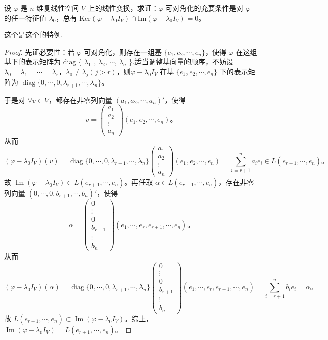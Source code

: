 \documentclass[../../main.tex]{subfiles}
\begin{document}
\begin{proposition}\label{proposition:线性变换可对角化的几何充要条件1}
设 $\varphi$ 是 $n$ 维复线性空间 $V$ 上的线性变换，求证：$\varphi$ 可对角化的充要条件是对 $\varphi$ 的任一特征值 $\lambda_0$，总有 $\mathrm{Ker}(\varphi - \lambda_0I_V)\cap\mathrm{Im}(\varphi - \lambda_0I_V)=0$。
\end{proposition}
\begin{remark}
这个是这个的特例.
\end{remark}
\begin{proof}
{\heiti 先证必要性：}若 $\varphi$ 可对角化，则存在一组基 $\{e_1,e_2,\cdots,e_n\}$，使得 $\varphi$ 在这组基下的表示矩阵为 $\mathrm{diag}$ $\{$ $\lambda_1$ , $\lambda_2$, $\cdots$, $\lambda_n$ $\}$.适当调整基向量的顺序，不妨设 $\lambda_0 = \lambda_1 = \cdots = \lambda_r$，$\lambda_0\neq\lambda_j (j > r)$，则\(\varphi - \lambda_0 I_V\) 在基 \(\{e_1, e_2, \cdots, e_n\}\) 下的表示矩阵为 \(\operatorname{diag}\{0, \cdots, 0, \lambda_{r+1}, \cdots, \lambda_n\}\)。

于是对 \(\forall v \in V\)，都存在非零列向量 \((a_1, a_2, \cdots, a_n)'\)，使得
\[
v = \begin{pmatrix}
a_1 \\
a_2 \\
\vdots \\
a_n
\end{pmatrix}
(e_1, e_2, \cdots, e_n)。
\]
从而
\[
(\varphi - \lambda_0 I_V)(v) = \operatorname{diag}\{0, \cdots, 0, \lambda_{r+1}, \cdots, \lambda_n\}
\begin{pmatrix}
a_1 \\
a_2 \\
\vdots \\
a_n
\end{pmatrix}
(e_1, e_2, \cdots, e_n)
= \sum_{i=r+1}^n a_i e_i \in L(e_{r+1}, \cdots, e_n)。
\]
故 \(\operatorname{Im}(\varphi - \lambda_0 I_V) \subset L(e_{r+1}, \cdots, e_n)\)。再任取 \(\alpha \in L(e_{r+1}, \cdots, e_n)\)，存在非零列向量 \((0, \cdots, 0, b_{r+1}, \cdots, b_n)'\)，使得
\[
\alpha = \begin{pmatrix}
0 \\
\vdots \\
0 \\
b_{r+1} \\
\vdots \\
b_n
\end{pmatrix}
(e_1, \cdots, e_r, e_{r+1}, \cdots, e_n)。
\]
从而
\[
(\varphi - \lambda_0 I_V)(\alpha) = \operatorname{diag}\{0, \cdots, 0, \lambda_{r+1}, \cdots, \lambda_n\}
\begin{pmatrix}
0 \\
\vdots \\
0 \\
b_{r+1} \\
\vdots \\
b_n
\end{pmatrix}
(e_1, \cdots, e_r, e_{r+1}, \cdots, e_n)
= \sum_{i=r+1}^n b_i e_i = \alpha。
\]
故 \(L(e_{r+1}, \cdots, e_n) \subset \operatorname{Im}(\varphi - \lambda_0 I_V)\)。综上，\(\operatorname{Im}(\varphi - \lambda_0 I_V) = L(e_{r+1}, \cdots, e_n)\)。


\end{proof}
\end{document}
